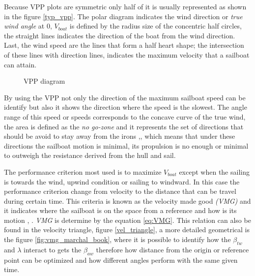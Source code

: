 Because VPP plots are symmetric only half of it is usually represented as shown in the figure \ref {typ_vpp}. The polar diagram indicates the wind direction or \textit{true wind angle} at 0\degree , $V_{boat}$ is defined by the radius size of the concentric half circles, the straight lines indicates the direction of the boat from the wind direction. Last, 
the wind speed are the lines that form a half heart shape; the intersection of these lines with direction lines, indicates the maximum velocity that a sailboat can attain. \par 
\begin{figure} %
  \centering
  \hfill
  \caption{VPP diagram}
\label{vpp_diag} 
\end{figure}

By using the VPP not only the direction of the maximum sailboat speed can be identify but also it shows the direction where the speed is the slowest. The angle range of this speed or speeds corresponds to the concave curve of the true wind, the area is defined as the \textit{no go-zone} and it represents the set of directions that should be avoid to stay away from the irons \cite{yang2011control},\cite{denny2009float}, which means that under these directions the sailboat  motion is minimal, its propulsion is no enough or minimal to outweigh the resistance derived from the hull and sail.\par 

The performance criterion most used is to maximize $V_{boat}$ except when the sailing is towards the wind, upwind condition or sailing to windward. In this case the performance criterion change from velocity to the distance that can be travel during certain time.  This criteria is known as the velocity made good \textit{(VMG)} and it indicates where the sailboat is on the space from a reference and how is its motion \cite{larsonprinciples}, \cite{marchajaereo1979} \cite{philpott1993yacht}. \textit{VMG} is determine by the equation \ref{eq:VMG}. This relation can also be found in the velocity triangle, figure \ref{vel_triangle}, a more detailed geometrical is the figure \ref{fig:vmg_marchal_book}, where it is possible to identify how the $\beta_{tw}$ and $\lambda$ interact to gets the $\beta_{aw}$ therefore how distance from the origin or reference point can be optimized and how different angles perform with the same given time. \par

